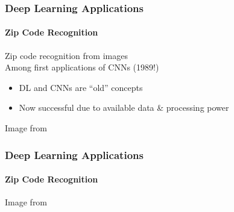 \documentclass[xetex,professionalfont]{beamer}
\begin{document}

\begin{frame}
\frametitle{Deep Learning Applications}
\framesubtitle{Zip Code Recognition}

Zip code recognition from images\\\medskip
Among first applications of CNNs (1989!)
\begin{itemize}
    \item DL and CNNs are \enquote{old} concepts
    \item Now successful due to available data \& processing power %
\end{itemize}

\bigskip
\begin{center}
    {\centering Image from \cite{lecun1989}}
\end{center}

\end{frame}


\begin{frame}
\frametitle{Deep Learning Applications}
\framesubtitle{Zip Code Recognition}


\begin{center}
    {\centering Image from \cite{lecun1989}}
\end{center}

\end{frame}
\end{document}
